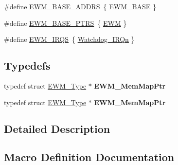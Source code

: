 \begin{DoxyCompactItemize}
\item 
\#define \hyperlink{group__EWM__Peripheral__Access__Layer_ga1c3d806fd3948bbda5da2601cda208b4}{E\+W\+M\+\_\+\+B\+A\+S\+E\+\_\+\+A\+D\+D\+RS}~\{ \hyperlink{group__EWM__Peripheral__Access__Layer_ga8609fc69000c45828e80571006c9c5c2}{E\+W\+M\+\_\+\+B\+A\+SE} \}
\item 
\#define \hyperlink{group__EWM__Peripheral__Access__Layer_ga8b79ee9e363583bee6122ee3da7952b2}{E\+W\+M\+\_\+\+B\+A\+S\+E\+\_\+\+P\+T\+RS}~\{ \hyperlink{group__EWM__Peripheral__Access__Layer_ga4c690a7633d3de9e8469adc23f784085}{E\+WM} \}
\item 
\#define \hyperlink{group__EWM__Peripheral__Access__Layer_gac4f8bfcf7bfc6874ed0b321c67dd3111}{E\+W\+M\+\_\+\+I\+R\+QS}~\{ \hyperlink{group__Interrupt__vector__numbers_gga666eb0caeb12ec0e281415592ae89083a3f04766f3177f0152623a86e39ccef06}{Watchdog\+\_\+\+I\+R\+Qn} \}
\end{DoxyCompactItemize}
\subsection*{Typedefs}
\begin{DoxyCompactItemize}
\item 
typedef struct \hyperlink{structEWM__Type}{E\+W\+M\+\_\+\+Type} $\ast$ {\bfseries E\+W\+M\+\_\+\+Mem\+Map\+Ptr}\hypertarget{group__EWM__Peripheral__Access__Layer_ga8c6d5c20c0d2bce4882678dc99f5f89a}{}\label{group__EWM__Peripheral__Access__Layer_ga8c6d5c20c0d2bce4882678dc99f5f89a}

\item 
typedef struct \hyperlink{structEWM__Type}{E\+W\+M\+\_\+\+Type} $\ast$ {\bfseries E\+W\+M\+\_\+\+Mem\+Map\+Ptr}\hypertarget{group__EWM__Peripheral__Access__Layer_ga8c6d5c20c0d2bce4882678dc99f5f89a}{}\label{group__EWM__Peripheral__Access__Layer_ga8c6d5c20c0d2bce4882678dc99f5f89a}

\end{DoxyCompactItemize}


\subsection{Detailed Description}


\subsection{Macro Definition Documentation}
